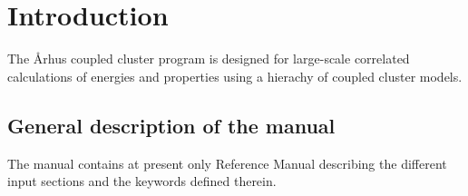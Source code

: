 \chapter{Introduction}\label{ch:cc_intro}

The {\AA}rhus coupled cluster program is designed for large-scale
correlated calculations of energies and properties using a
hierachy of coupled cluster models.

\section{General description of the manual}

The manual contains at present only Reference Manual describing
the different input sections and the keywords defined therein.


